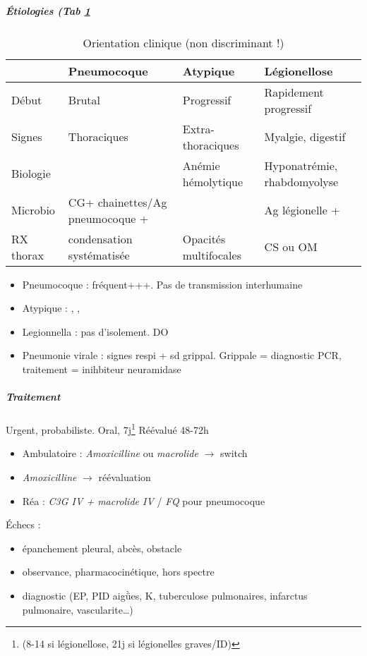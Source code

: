 \documentclass[11pt]{article}
\begin{document}
\subparagraph{Étiologies (Tab \ref{tab:orga96c23e}}
\label{sec:orgee26741}
\begin{table}[htbp]
\caption{\label{tab:orga96c23e}
Orientation clinique (non discriminant !)}
\centering
\begin{tabular}{llll}
 & Pneumocoque & Atypique & Légionellose\\
\hline
Début & Brutal & Progressif & Rapidement progressif\\
Signes & Thoraciques & Extra-thoraciques & Myalgie, digestif\\
Biologie &  & Anémie hémolytique & Hyponatrémie, rhabdomyolyse\\
Microbio & CG+ chainettes/Ag pneumocoque + &  & Ag légionelle +\\
RX thorax & condensation systématisée & Opacités multifocales & CS ou OM\\
\end{tabular}
\end{table}
\begin{itemize}
\item Pneumocoque : fréquent+++. Pas de transmission interhumaine
\item Atypique : , , 
\item Legionnella : pas d'isolement. DO
\item Pneumonie virale : signes respi + sd grippal. Grippale = diagnostic PCR, traitement = inihbiteur neuramidase \danger {}
\end{itemize}

\subparagraph{Traitement}
\label{sec:orgded3edd}
Urgent, probabiliste. Oral, 7j\footnote{(8-14 si légionellose, 21j si légionelles graves/ID)}  Réévalué 48-72h

\begin{itemize}
\item Ambulatoire : \emph{Amoxicilline} ou \emph{macrolide} \(\to\) switch
\item \faHospitalO  \emph{Amoxicilline} \(\to\) réévaluation
\item Réa : \emph{C3G IV + macrolide IV} / \emph{FQ} pour pneumocoque
\end{itemize}

Échecs : 
\begin{itemize}
\item épanchement pleural, abcès, obstacle
\item observance, pharmacocinétique, hors spectre
\item diagnostic (EP, PID aigǜes, K, tuberculose pulmonaires, infarctus pulmonaire, vascularite\ldots{})
\end{itemize}
\end{document}
